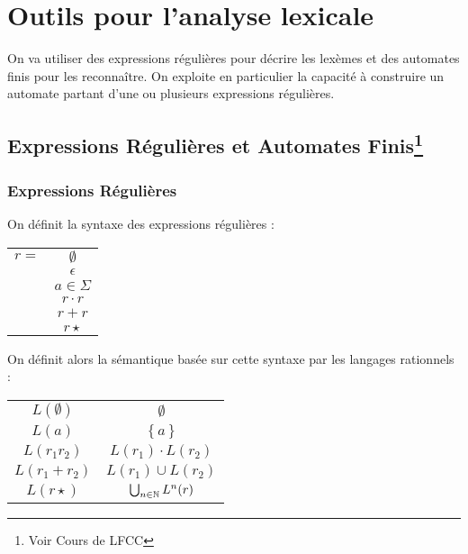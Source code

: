 \documentclass{cours}
\begin{document}
\section{Outils pour l'analyse lexicale}
On va utiliser des expressions régulières pour décrire les lexèmes et des automates finis pour les reconnaître. On exploite en particulier la capacité à construire un automate partant d'une ou plusieurs expressions régulières.

\subsection[Expressions Régulières et Automates Finis]{Expressions Régulières et Automates Finis\footnote{Voir Cours de LFCC}} 

\subsubsection{Expressions Régulières}
\begin{definition}[Syntaxe]
    On définit la syntaxe des expressions régulières :
\begin{center}
    \begin{tabular}{c@{$\mid$}c}
        $r = $& $\emptyset$\\
        &$\epsilon$\\
        &$a \in \Sigma$\\
        &$r \cdot r$\\
        &$r + r$\\
        &$r\star$\\    
    \end{tabular}    
\end{center} 
\end{definition}

\begin{definition}[Sémantique]
    On définit alors la sémantique basée sur cette syntaxe par les langages rationnels : 
    \begin{center}
        \begin{tabular}{c@{ = }c}
            $L(\emptyset)$ &$\emptyset$\\
            $L(a)$ &$\left\{a\right\}$\\
            $L(r_{1}r_{2})$ &$L(r_{1}) \cdot L(r_{2})$\\
            $L(r_{1} + r_{2})$ &$L(r_{1}) \cup L(r_{2})$\\
            $L(r\star)$ &$\bigcup_{n \in \mathbb{N}} L^{n}(r)$        
        \end{tabular}
    \end{center} 
\end{definition}
\end{document}
